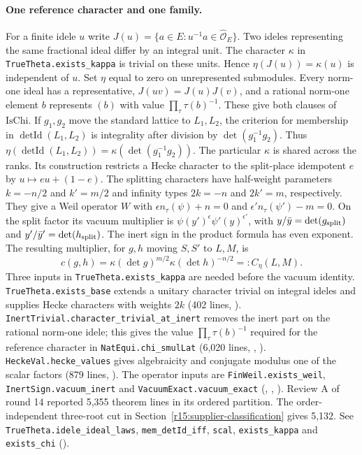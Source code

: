 \paragraph{One reference character and one family.}\label{r14:eq-reference}
For a finite idele $u$ write $J(u)=\{a\in E:u^{-1}a\in\widehat{\mathcal O}_E\}$.
Two ideles representing the same fractional ideal differ by an integral
unit. The character $\kappa$ in \nolinkurl{TrueTheta.exists_kappa} is trivial
on these units. Hence $\eta(J(u))=\kappa(u)$ is independent of $u$.
Set $\eta$ equal to zero on unrepresented submodules. Every norm-one
ideal has a representative, $J(uv)=J(u)J(v)$, and a rational
norm-one element $b$ represents $(b)$ with value
$\prod_\tau\tau(b)^{-1}$. These give both clauses of $\mathrm{IsChi}$.
If $g_1,g_2$ move the standard lattice to $L_1,L_2$, the criterion for
membership in $\operatorname{detId}(L_1,L_2)$ is integrality after division by
$\det(g_1^{-1}g_2)$. Thus
$\eta(\operatorname{detId}(L_1,L_2))=\kappa(\det(g_1^{-1}g_2))$.
The particular $\kappa$ is shared across the ranks. Its construction
restricts a Hecke character to the split-place idempotent $e$ by
$u\mapsto eu+(1-e)$. The splitting characters have half-weight parameters $k=-n/2$ and
$k'=m/2$ and infinity types $2k=-n$ and $2k'=m$, respectively.
They give a Weil operator $W$ with
$\epsilon n_\tau(\psi)+n=0$ and
$\epsilon' n_\tau(\psi')-m=0$. On the split factor its vacuum multiplier
is $\psi(y')^{\epsilon}\psi'(y)^{\epsilon'}$, with
$y/\bar y=\det(g_{\rm split})$ and
$y'/\bar y'=\det(h_{\rm split})$. The inert sign in the product formula
has even exponent. The resulting multiplier, for $g,h$ moving $S,S'$ to
$L,M$, is
\[
 c(g,h)=\kappa(\det g)^{m/2}\kappa(\det h)^{-n/2}
       =:C_\eta(L,M).
\]
Three inputs in \nolinkurl{TrueTheta.exists_kappa} are needed before the
vacuum identity. \nolinkurl{TrueTheta.exists_base} extends a unitary
character trivial on integral ideles and supplies Hecke characters with
weights $2k$ (402 lines, ).
\nolinkurl{InertTrivial.character_trivial_at_inert} removes the inert
part on the rational norm-one idele; this gives the value
$\prod_\tau\tau(b)^{-1}$ required for the reference character in
\nolinkurl{NatEqui.chi_smulLat} (6,020 lines,
,
). \nolinkurl{HeckeVal.hecke_values}
gives algebraicity and conjugate modulus one of the scalar factors
(879 lines, ).
The operator inputs are \nolinkurl{FinWeil.exists_weil},
\nolinkurl{InertSign.vacuum_inert} and \nolinkurl{VacuumExact.vacuum_exact}
(,
,
).
Review A of round 14 reported 5,355 theorem lines in its ordered partition. The order-independent three-root cut in Section~\ref{r15:supplier-classification} gives 5,132. See \nolinkurl{TrueTheta.idele_ideal_laws},
\nolinkurl{mem_detId_iff}, \nolinkurl{scal}, \nolinkurl{exists_kappa} and
\nolinkurl{exists_chi}
().

